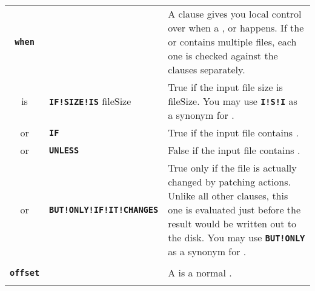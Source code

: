 \documentclass{article}
\def\ttref#1{\ahrefloc{#1}{\tt #1}}
\def\DEFINE#1{{\tt \bf #1}\label{#1}\index{#1}}
\begin{document}
\begin{tabular}{cp{10in}|p{10in}}
\DEFINE{when} & & A \ttref{when} clause gives you local control over when a
  \ttref{COPY}, \ttref{COPY!EXISTING} or \ttref{APPEND!COL} happens. If the
  \ttref{COPY} or \ttref{COPY!EXISTING} contains multiple files, each one
  is checked against the \ttref{when} clauses separately.  \\
is & \DEFINE{IF!SIZE!IS} fileSize & True if the input file size is
fileSize. You may use \DEFINE{I!S!I} as a synonym for \ttref{IF!SIZE!IS}. \\
or & \DEFINE{IF} \ttref{regexp} & True if the input file contains
\ttref{regexp}. \\
or & \DEFINE{UNLESS} \ttref{regexp} & False if the input file contains
\ttref{regexp}.  \\
or & \DEFINE{BUT!ONLY!IF!IT!CHANGES} & True only if the file is actually
changed by patching actions. Unlike all other \ttref{when} clauses, this
one is evaluated just before the result would be written out to the disk.
You may use \DEFINE{BUT!ONLY} as a synonym for \ttref{BUT!ONLY!IF!IT!CHANGES}.
\\

\\

\DEFINE{offset} & & A \ttref{offset} is a normal \ttref{value}.
\\

\\



\end{tabular}
\end{document}
